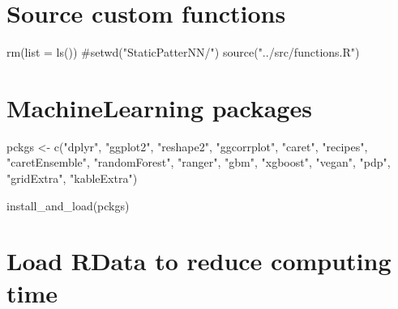 \documentclass[
  letterpaper,
  DIV=11,
  numbers=noendperiod]{scrreprt}
\newenvironment{Shaded}{\begin{snugshade}}{\end{snugshade}}
\newcommand{\AttributeTok}[1]{\textcolor[rgb]{0.40,0.45,0.13}{#1}}
\newcommand{\CommentTok}[1]{\textcolor[rgb]{0.37,0.37,0.37}{#1}}
\newcommand{\FunctionTok}[1]{\textcolor[rgb]{0.28,0.35,0.67}{#1}}
\newcommand{\NormalTok}[1]{\textcolor[rgb]{0.00,0.23,0.31}{#1}}
\newcommand{\OtherTok}[1]{\textcolor[rgb]{0.00,0.23,0.31}{#1}}
\newcommand{\StringTok}[1]{\textcolor[rgb]{0.13,0.47,0.30}{#1}}
\begin{document}
\section{Source custom functions}

\begin{Shaded}
\begin{Highlighting}[]
\FunctionTok{rm}\NormalTok{(}\AttributeTok{list =} \FunctionTok{ls}\NormalTok{())}
\CommentTok{\#setwd("StaticPatterNN/")}
\FunctionTok{source}\NormalTok{(}\StringTok{"../src/functions.R"}\NormalTok{)}
\end{Highlighting}
\end{Shaded}

\section{MachineLearning packages}

\begin{Shaded}
\begin{Highlighting}[]
\NormalTok{pckgs }\OtherTok{\textless{}{-}} \FunctionTok{c}\NormalTok{(}\StringTok{"dplyr"}\NormalTok{, }\StringTok{"ggplot2"}\NormalTok{, }\StringTok{"reshape2"}\NormalTok{, }
           \StringTok{"ggcorrplot"}\NormalTok{, }
           \StringTok{"caret"}\NormalTok{,  }\StringTok{"recipes"}\NormalTok{,   }\StringTok{"caretEnsemble"}\NormalTok{, }
           \StringTok{"randomForest"}\NormalTok{, }\StringTok{"ranger"}\NormalTok{, }\StringTok{"gbm"}\NormalTok{, }\StringTok{"xgboost"}\NormalTok{, }
           \StringTok{"vegan"}\NormalTok{, }\StringTok{"pdp"}\NormalTok{, }
           \StringTok{"gridExtra"}\NormalTok{, }\StringTok{"kableExtra"}\NormalTok{)}

\FunctionTok{install\_and\_load}\NormalTok{(pckgs)}
\end{Highlighting}
\end{Shaded}

\section{Load RData to reduce computing time}
\end{document}
